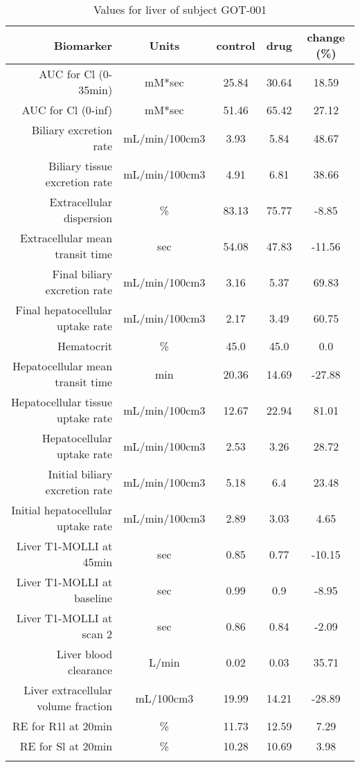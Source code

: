 \documentclass{epflreport}%
\begin{document}
%
\clearpage%
\begin{longtable}{rcccc}%
\hline%
Biomarker&Units&control&drug&change (\%)\\%
\hline%
AUC for Cl (0{-}35min)&mM*sec&25.84&30.64&18.59\\%
AUC for Cl (0{-}inf)&mM*sec&51.46&65.42&27.12\\%
Biliary excretion rate&mL/min/100cm3&3.93&5.84&48.67\\%
Biliary tissue excretion rate&mL/min/100cm3&4.91&6.81&38.66\\%
Extracellular dispersion&\%&83.13&75.77&{-}8.85\\%
Extracellular mean transit time&sec&54.08&47.83&{-}11.56\\%
Final biliary excretion rate&mL/min/100cm3&3.16&5.37&69.83\\%
Final hepatocellular uptake rate&mL/min/100cm3&2.17&3.49&60.75\\%
Hematocrit&\%&45.0&45.0&0.0\\%
Hepatocellular mean transit time&min&20.36&14.69&{-}27.88\\%
Hepatocellular tissue uptake rate&mL/min/100cm3&12.67&22.94&81.01\\%
Hepatocellular uptake rate&mL/min/100cm3&2.53&3.26&28.72\\%
Initial biliary excretion rate&mL/min/100cm3&5.18&6.4&23.48\\%
Initial hepatocellular uptake rate&mL/min/100cm3&2.89&3.03&4.65\\%
Liver T1{-}MOLLI at 45min&sec&0.85&0.77&{-}10.15\\%
Liver T1{-}MOLLI at baseline&sec&0.99&0.9&{-}8.95\\%
Liver T1{-}MOLLI at scan 2&sec&0.86&0.84&{-}2.09\\%
Liver blood clearance&L/min&0.02&0.03&35.71\\%
Liver extracellular volume fraction&mL/100cm3&19.99&14.21&{-}28.89\\%
RE for R1l at 20min&\%&11.73&12.59&7.29\\%
RE for Sl at 20min&\%&10.28&10.69&3.98\\%
\hline%
\caption{Values for liver of subject GOT-001} \\%
\end{longtable}%
\end{document}
